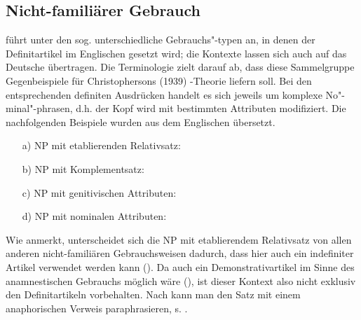 \subsection{Nicht-familiärer Gebrauch}\label{sec:nicht-fam}

\textcite[130-149]{Hawkins1978} führt unter den sog.  unterschiedliche Gebrauchs"-typen an, in denen der Definitartikel im Englischen gesetzt wird; die Kontexte lassen sich auch auf das Deutsche übertragen. Die Terminologie zielt darauf ab, dass diese Sammelgruppe Gegenbeispiele für Christophersons (1939) -Theorie liefern soll. Bei den entsprechenden definiten Ausdrücken handelt es sich jeweils um komplexe No"-minal"-phrasen, d.h. der Kopf wird mit bestimmten Attributen modifiziert. Die nachfolgenden Beispiele \parencite[vgl. die Übersicht in][37]{Himmelmann1997} wurden aus dem Englischen übersetzt.
 
\begin{itemize} 
		\item[a)] \label{etab} NP mit etablierenden Relativsatz: \\  
		\item[b)] \label{komp} NP mit Komplementsatz: \\  
		\item[c)] \label{gen-attr} NP mit genitivischen Attributen: \\ 
		\item[d)] \label{n-attr} NP mit nominalen Attributen: \\ 
\end{itemize}

Wie \textcite[38]{Himmelmann1997} anmerkt, unterscheidet sich die NP mit etablierendem Relativsatz von allen anderen nicht-familiären Gebrauchsweisen dadurch, dass hier auch ein indefiniter Artikel verwendet werden kann (). Da auch ein Demonstrativartikel im Sinne des anamnestischen Gebrauchs möglich wäre (), ist dieser Kontext also nicht exklusiv den Definitartikeln vorbehalten. Nach \textcite[308]{Lobner1985} kann man den Satz mit einem anaphorischen Verweis paraphrasieren, s. . %

